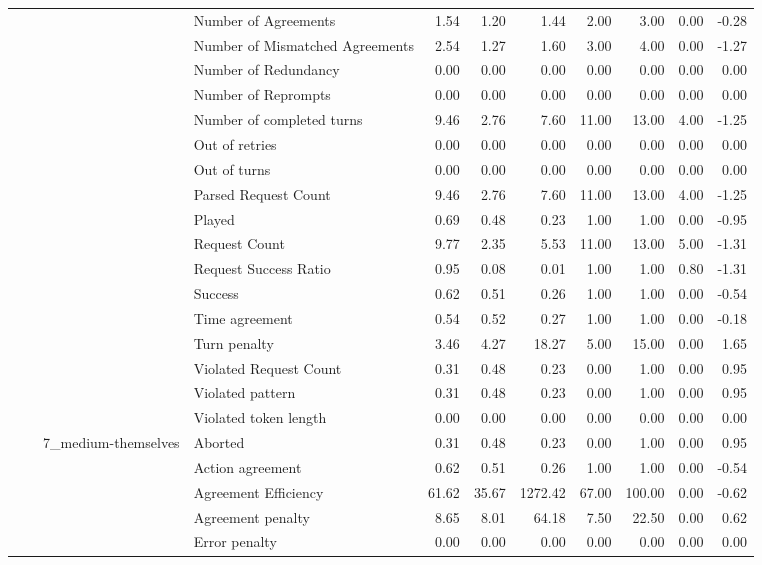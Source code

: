 \begin{tabular}{llllrrrrrrr}
 &  &  & Number of Agreements & 1.54 & 1.20 & 1.44 & 2.00 & 3.00 & 0.00 & -0.28 \\
 &  &  & Number of Mismatched Agreements & 2.54 & 1.27 & 1.60 & 3.00 & 4.00 & 0.00 & -1.27 \\
 &  &  & Number of Redundancy & 0.00 & 0.00 & 0.00 & 0.00 & 0.00 & 0.00 & 0.00 \\
 &  &  & Number of Reprompts & 0.00 & 0.00 & 0.00 & 0.00 & 0.00 & 0.00 & 0.00 \\
 &  &  & Number of completed turns & 9.46 & 2.76 & 7.60 & 11.00 & 13.00 & 4.00 & -1.25 \\
 &  &  & Out of retries & 0.00 & 0.00 & 0.00 & 0.00 & 0.00 & 0.00 & 0.00 \\
 &  &  & Out of turns & 0.00 & 0.00 & 0.00 & 0.00 & 0.00 & 0.00 & 0.00 \\
 &  &  & Parsed Request Count & 9.46 & 2.76 & 7.60 & 11.00 & 13.00 & 4.00 & -1.25 \\
 &  &  & Played & 0.69 & 0.48 & 0.23 & 1.00 & 1.00 & 0.00 & -0.95 \\
 &  &  & Request Count & 9.77 & 2.35 & 5.53 & 11.00 & 13.00 & 5.00 & -1.31 \\
 &  &  & Request Success Ratio & 0.95 & 0.08 & 0.01 & 1.00 & 1.00 & 0.80 & -1.31 \\
 &  &  & Success & 0.62 & 0.51 & 0.26 & 1.00 & 1.00 & 0.00 & -0.54 \\
 &  &  & Time agreement & 0.54 & 0.52 & 0.27 & 1.00 & 1.00 & 0.00 & -0.18 \\
 &  &  & Turn penalty & 3.46 & 4.27 & 18.27 & 5.00 & 15.00 & 0.00 & 1.65 \\
 &  &  & Violated Request Count & 0.31 & 0.48 & 0.23 & 0.00 & 1.00 & 0.00 & 0.95 \\
 &  &  & Violated pattern & 0.31 & 0.48 & 0.23 & 0.00 & 1.00 & 0.00 & 0.95 \\
 &  &  & Violated token length & 0.00 & 0.00 & 0.00 & 0.00 & 0.00 & 0.00 & 0.00 \\
\cline{3-11}
 &  & \multirow[t]{27}{*}{7_medium-themselves} & Aborted & 0.31 & 0.48 & 0.23 & 0.00 & 1.00 & 0.00 & 0.95 \\
 &  &  & Action agreement & 0.62 & 0.51 & 0.26 & 1.00 & 1.00 & 0.00 & -0.54 \\
 &  &  & Agreement Efficiency & 61.62 & 35.67 & 1272.42 & 67.00 & 100.00 & 0.00 & -0.62 \\
 &  &  & Agreement penalty & 8.65 & 8.01 & 64.18 & 7.50 & 22.50 & 0.00 & 0.62 \\
 &  &  & Error penalty & 0.00 & 0.00 & 0.00 & 0.00 & 0.00 & 0.00 & 0.00 \\

\end{tabular}
